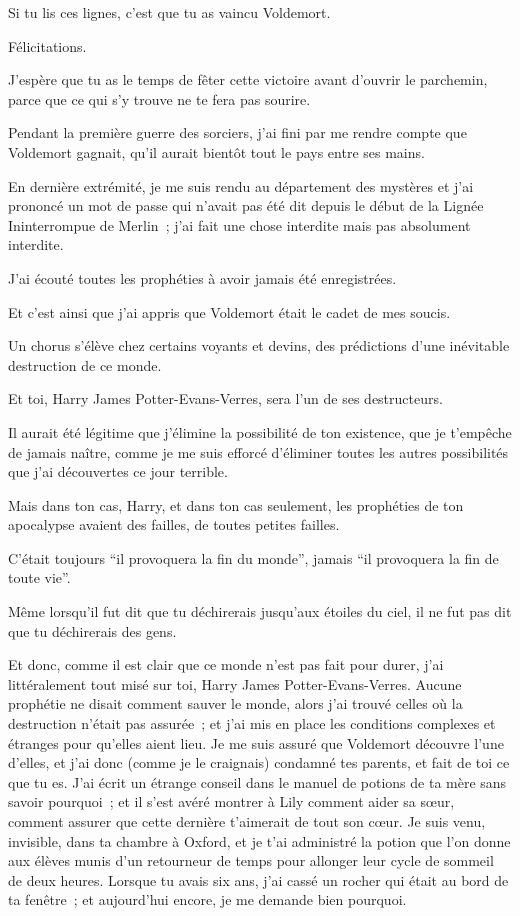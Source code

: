 \later
\begin{writtenNote}

Si tu lis ces lignes, c'est que tu as vaincu Voldemort.

Félicitations.

J'espère que tu as le temps de fêter cette victoire avant d'ouvrir le parchemin, parce que ce qui s'y trouve ne te fera pas sourire.

Pendant la première guerre des sorciers, j'ai fini par me rendre compte que Voldemort gagnait, qu'il aurait bientôt tout le pays entre ses mains.

En dernière extrémité, je me suis rendu au département des mystères et j'ai prononcé un mot de passe qui n'avait pas été dit depuis le début de la Lignée Ininterrompue de Merlin~; j'ai fait une chose interdite mais pas absolument interdite.

J'ai écouté toutes les prophéties à avoir jamais été enregistrées.

Et c'est ainsi que j'ai appris que Voldemort était le cadet de mes soucis.

Un chorus s'élève chez certains voyants et devins, des prédictions d'une inévitable destruction de ce monde.

Et toi, Harry James Potter-Evans-Verres, sera l'un de ses destructeurs.

Il aurait été légitime que j'élimine la possibilité de ton existence, que je t'empêche de jamais naître, comme je me suis efforcé d'éliminer toutes les autres possibilités que j'ai découvertes ce jour terrible.

Mais dans ton cas, Harry, et dans ton cas seulement, les prophéties de ton apocalypse avaient des failles, de toutes petites failles.

C'était toujours “il provoquera la fin du monde”, jamais “il provoquera la fin de toute vie”.

Même lorsqu'il fut dit que tu déchirerais jusqu'aux étoiles du ciel, il ne fut pas dit que tu déchirerais des gens.

Et donc, comme il est clair que ce monde n'est pas fait pour durer, j'ai littéralement tout misé sur toi, Harry James Potter-Evans-Verres.
Aucune prophétie ne disait comment sauver le monde, alors j'ai trouvé celles où la destruction n'était pas assurée~; et j'ai mis en place les conditions complexes et étranges pour qu'elles aient lieu.
Je me suis assuré que Voldemort découvre l'une d'elles, et j'ai donc (comme je le craignais) condamné tes parents, et fait de toi ce que tu es.
J'ai écrit un étrange conseil dans le manuel de potions de ta mère sans savoir pourquoi~; et il s'est avéré montrer à Lily comment aider sa sœur, comment assurer que cette dernière t'aimerait de tout son cœur.
Je suis venu, invisible, dans ta chambre à Oxford, et je t'ai administré la potion que l'on donne aux élèves munis d'un retourneur de temps pour allonger leur cycle de sommeil de deux heures.
Lorsque tu avais six ans, j'ai cassé un rocher qui était au bord de ta fenêtre~; et aujourd'hui encore, je me demande bien pourquoi.


\end{writtenNote}
